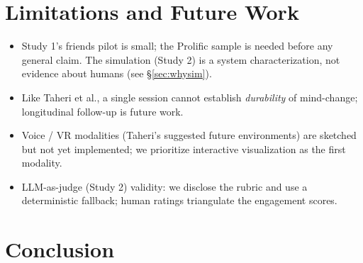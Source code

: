 \documentclass[manuscript,screen]{acmart}
\begin{document}
\section{Limitations and Future Work}
\label{sec:limits}
\begin{itemize}
  \item Study 1's friends pilot is small; the Prolific sample is needed before any
    general claim. The simulation (Study 2) is a system characterization, not evidence
    about humans (see \S\ref{sec:whysim}).
  \item Like Taheri et al., a single session cannot establish \emph{durability} of
    mind-change; longitudinal follow-up is future work.
  \item Voice / VR modalities (Taheri's suggested future environments) are sketched but
    not yet implemented; we prioritize interactive visualization as the first modality.
  \item LLM-as-judge (Study 2) validity: we disclose the rubric and use a deterministic
    fallback; human ratings triangulate the engagement scores.
\end{itemize}

\section{Conclusion}
\end{document}
